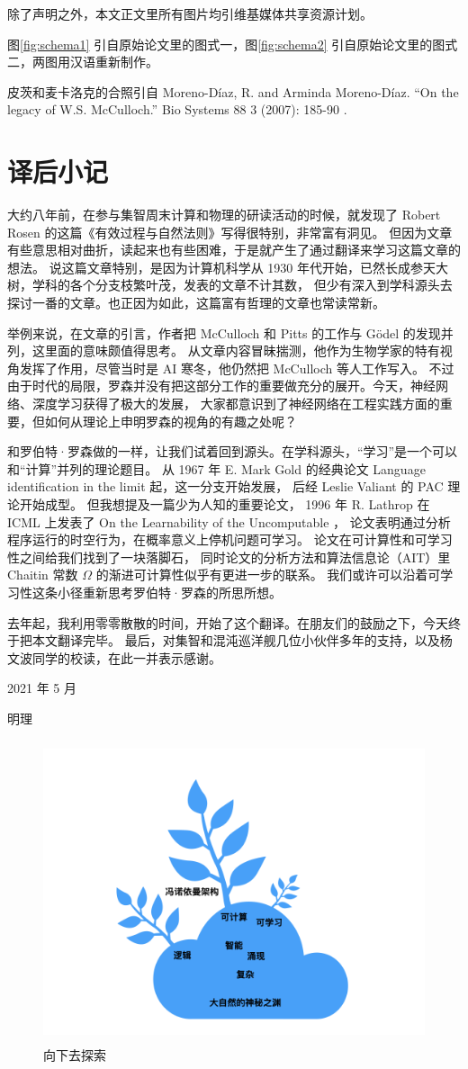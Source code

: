 \documentclass[a4paper,12pt]{article}
\begin{document}
除了声明之外，本文正文里所有图片均引维基媒体共享资源计划。

图\ref{fig:schema1} 引自原始论文里的图式一，图\ref{fig:schema2} 引自原始论文里的图式二，两图用汉语重新制作。

皮茨和麦卡洛克的合照引自 Moreno-Díaz, R. and Arminda Moreno-Díaz. “On the legacy of W.S. McCulloch.” Bio Systems 88 3 (2007): 185-90 .


\newpage
\section{译后小记}

大约八年前，在参与集智周末计算和物理的研读活动的时候，就发现了 Robert Rosen 的这篇《有效过程与自然法则》写得很特别，非常富有洞见。
但因为文章有些意思相对曲折，读起来也有些困难，于是就产生了通过翻译来学习这篇文章的想法。
说这篇文章特别，是因为计算机科学从 1930 年代开始，已然长成参天大树，学科的各个分支枝繁叶茂，发表的文章不计其数，
但少有深入到学科源头去探讨一番的文章。也正因为如此，这篇富有哲理的文章也常读常新。

举例来说，在文章的引言，作者把 McCulloch 和 Pitts 的工作与 G{\"o}del 的发现并列，这里面的意味颇值得思考。
从文章内容冒昧揣测，他作为生物学家的特有视角发挥了作用，尽管当时是 AI 寒冬，他仍然把 McCulloch 等人工作写入。
不过由于时代的局限，罗森并没有把这部分工作的重要做充分的展开。今天，神经网络、深度学习获得了极大的发展，
大家都意识到了神经网络在工程实践方面的重要，但如何从理论上申明罗森的视角的有趣之处呢？

和罗伯特·罗森做的一样，让我们试着回到源头。在学科源头，“学习”是一个可以和“计算”并列的理论题目。
从 1967 年 E. Mark Gold 的经典论文 Language identification in the limit 起，这一分支开始发展， 后经 Leslie Valiant 的 PAC 理论开始成型。
但我想提及一篇少为人知的重要论文， 1996 年 R. Lathrop 在 ICML 上发表了 On the Learnability of the Uncomputable ，
论文表明通过分析程序运行的时空行为，在概率意义上停机问题可学习。 论文在可计算性和可学习性之间给我们找到了一块落脚石，
同时论文的分析方法和算法信息论（AIT）里 Chaitin 常数 $\Omega$ 的渐进可计算性似乎有更进一步的联系。
我们或许可以沿着可学习性这条小径重新思考罗伯特·罗森的所思所想。

去年起，我利用零零散散的时间，开始了这个翻译。在朋友们的鼓励之下，今天终于把本文翻译完毕。
最后，对集智和混沌巡洋舰几位小伙伴多年的支持，以及杨文波同学的校读，在此一并表示感谢。

\hfill \hfill 2021 年 5 月

\hfill \hfill 明理

\begin{figure}[ht]
\centering
\includegraphics[height=3.5in]{images/landscape.png}
\captionsetup{labelformat=empty}
\caption{向下去探索}
\end{figure}
\end{document}
